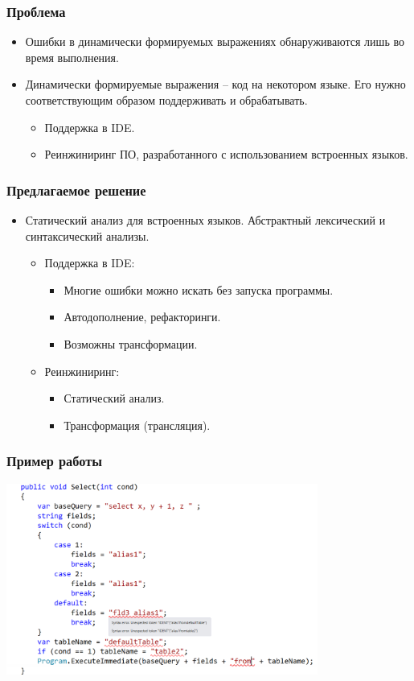 \documentclass{beamer}
\begin{document}
\begin{frame}[fragile]
	\transwipe[direction=90]
	\frametitle{Проблема}
	\begin{itemize}
	    \item Ошибки в динамически формируемых выражениях обнаруживаются лишь во время выполнения.
	    \item Динамически формируемые выражения -- код на некотором языке. Его нужно соответствующим образом поддерживать и обрабатывать.
        \begin{itemize}
	        \item Поддержка в IDE.
	        \item Реинжиниринг ПО, разработанного с использованием встроенных языков.
	    \end{itemize}
    \end{itemize}
\end{frame}

\begin{frame}[fragile]
	\transwipe[direction=90]
	\frametitle{Предлагаемое решение}
	\begin{itemize}
	    \item Статический анализ для встроенных языков. Абстрактный лексический и синтаксический анализы.
	    \begin{itemize}
		    \item Поддержка в IDE:
        	\begin{itemize}
        		\item Многие ошибки можно искать без запуска программы.
            	\item Автодополнение, рефакторинги.
            	\item Возможны трансформации.
            \end{itemize}
	        \item Реинжиниринг:
        	\begin{itemize}
        		\item Статический анализ.
            	\item Трансформация (трансляция).
            \end{itemize}
	    \end{itemize}
    \end{itemize}
\end{frame}

\begin{frame}[fragile]
	\transwipe[direction=90]
	\frametitle{Пример работы}
	\begin{center}
	    \includegraphics[width=290pt]{Screen1.png}
	\end{center}
\end{frame}
\end{document}
